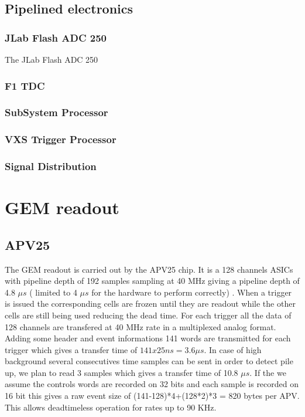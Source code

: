 \documentclass{article}
\begin{document}
\subsection{Pipelined electronics}
\subsubsection{JLab Flash ADC 250}


The JLab Flash ADC 250
\subsubsection{F1 TDC}
\subsubsection{SubSystem Processor}
\subsubsection{VXS Trigger Processor}
\subsubsection{Signal Distribution}

\section{GEM readout}
\subsection{APV25}
The GEM readout is carried out by the APV25 chip. It is a 128 channels ASICs with pipeline depth of 192 samples sampling at 40 MHz giving a pipeline depth of 4.8 $\mu s$ ( limited to 4 $\mu s$ for the hardware to perform correctly) . When a trigger is issued the corresponding cells are frozen until they are readout while the other cells are still being used reducing the dead time.
For each trigger all the data of 128 channels are transfered at 40 MHz rate in a multiplexed analog format. Adding some header and event informations 141 words are transmitted for each trigger which gives a transfer time of $141x25 ns = 3.6 \mu s $. In case of high background several consecutives time samples can be sent in order to detect pile up, we plan to read 3 samples which gives a transfer time of 10.8 $\mu s$. If the we assume the controls words are recorded on 32 bits and each sample is recorded on 16 bit this gives a raw event size of (141-128)*4+(128*2)*3 = 820 bytes per APV. This allows deadtimeless operation for rates up to 90 KHz.
\end{document}
